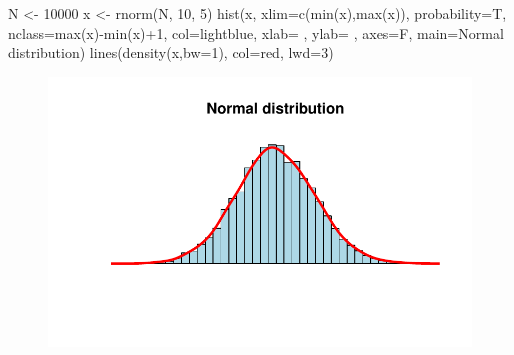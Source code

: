 \documentclass[
  letterpaper,
  DIV=11,
  numbers=noendperiod]{scrartcl}
\newenvironment{Shaded}{\begin{snugshade}}{\end{snugshade}}
\newcommand{\AttributeTok}[1]{\textcolor[rgb]{0.40,0.45,0.13}{#1}}
\newcommand{\DecValTok}[1]{\textcolor[rgb]{0.68,0.00,0.00}{#1}}
\newcommand{\FunctionTok}[1]{\textcolor[rgb]{0.28,0.35,0.67}{#1}}
\newcommand{\NormalTok}[1]{\textcolor[rgb]{0.00,0.23,0.31}{#1}}
\newcommand{\OtherTok}[1]{\textcolor[rgb]{0.00,0.23,0.31}{#1}}
\newcommand{\SpecialCharTok}[1]{\textcolor[rgb]{0.37,0.37,0.37}{#1}}
\newcommand{\StringTok}[1]{\textcolor[rgb]{0.13,0.47,0.30}{#1}}
\begin{document}
\begin{Shaded}
\begin{Highlighting}[]
\NormalTok{ N }\OtherTok{\textless{}{-}} \DecValTok{10000}
\NormalTok{ x }\OtherTok{\textless{}{-}} \FunctionTok{rnorm}\NormalTok{(N, }\DecValTok{10}\NormalTok{, }\DecValTok{5}\NormalTok{)}
 \FunctionTok{hist}\NormalTok{(x, }
 \AttributeTok{xlim=}\FunctionTok{c}\NormalTok{(}\FunctionTok{min}\NormalTok{(x),}\FunctionTok{max}\NormalTok{(x)), }\AttributeTok{probability=}\NormalTok{T, }\AttributeTok{nclass=}\FunctionTok{max}\NormalTok{(x)}\SpecialCharTok{{-}}\FunctionTok{min}\NormalTok{(x)}\SpecialCharTok{+}\DecValTok{1}\NormalTok{, }
   \AttributeTok{col=}\StringTok{\textquotesingle{}lightblue\textquotesingle{}}\NormalTok{, }\AttributeTok{xlab=}\StringTok{\textquotesingle{} \textquotesingle{}}\NormalTok{, }\AttributeTok{ylab=}\StringTok{\textquotesingle{} \textquotesingle{}}\NormalTok{, }\AttributeTok{axes=}\NormalTok{F,}
   \AttributeTok{main=}\StringTok{\textquotesingle{}Normal distribution\textquotesingle{}}\NormalTok{)}
\FunctionTok{lines}\NormalTok{(}\FunctionTok{density}\NormalTok{(x,}\AttributeTok{bw=}\DecValTok{1}\NormalTok{), }\AttributeTok{col=}\StringTok{\textquotesingle{}red\textquotesingle{}}\NormalTok{, }\AttributeTok{lwd=}\DecValTok{3}\NormalTok{)}
\end{Highlighting}
\end{Shaded}

\begin{figure}[H]

{\centering \includegraphics{index_files/figure-pdf/unnamed-chunk-16-1.pdf}

}

\end{figure}
\end{document}
